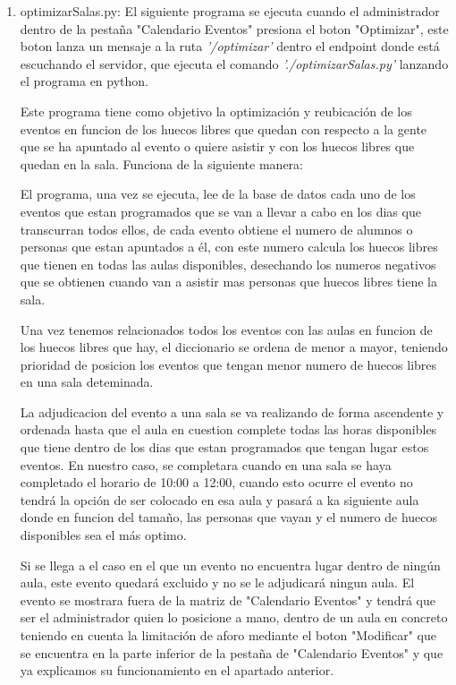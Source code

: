 \documentclass[a4paper, 12pt]{book}
\begin{document}
\begin{enumerate}
  	
  	\item optimizarSalas.py: El siguiente programa se ejecuta cuando el administrador dentro de la pestaña "Calendario Eventos" presiona el boton "Optimizar", este boton lanza un mensaje a la ruta \textit{'/optimizar'} dentro el endpoint donde está escuchando el servidor, que ejecuta el comando \textit{'./optimizarSalas.py'} lanzando el programa en python. 
  	
  	Este programa tiene como objetivo la optimización y reubicación de los eventos en funcion de los huecos libres que quedan con respecto a la gente que se ha apuntado al evento o quiere asistir y con los huecos libres que quedan en la sala. Funciona de la siguiente manera:
  	
  	El programa, una vez se ejecuta, lee de la base de datos cada uno de los eventos que estan programados que se van a llevar a cabo en los dias que transcurran todos ellos, de cada evento obtiene el numero de alumnos o personas que estan apuntados a él, con este numero calcula los huecos libres que tienen en todas las aulas disponibles, desechando los numeros negativos que se obtienen cuando van a asistir mas personas que huecos libres tiene la sala.
  	
  	Una vez tenemos relacionados todos los eventos con las aulas en funcion de los huecos libres que hay, el diccionario se ordena de menor a mayor, teniendo prioridad de posicion los eventos que tengan menor numero de huecos libres en una sala deteminada.
  	 
  	La adjudicacion del evento a una sala se va realizando de forma ascendente y ordenada hasta que el aula en cuestion complete todas las horas disponibles que tiene dentro de los dias que estan programados que tengan lugar estos eventos. En nuestro caso, se completara cuando en una sala se haya completado el horario de 10:00 a 12:00, cuando esto ocurre el evento no tendrá la opción de ser colocado en esa aula y pasará a ka siguiente aula donde en funcion del tamaño, las personas que vayan y el numero de huecos disponibles sea el más optimo.
  	
  	Si se llega a el caso en el que un evento no encuentra lugar dentro de ningún aula, este evento quedará excluido y no se le adjudicará ningun aula. El evento se mostrara fuera de la matriz de "Calendario Eventos"  y tendrá que ser el administrador quien lo posicione a mano, dentro de un aula en concreto teniendo en cuenta la limitación de aforo mediante el boton "Modificar" que se encuentra en la parte inferior de la pestaña de "Calendario Eventos" y que ya explicamos su funcionamiento en el apartado anterior.
	\end{enumerate}
\end{document}
